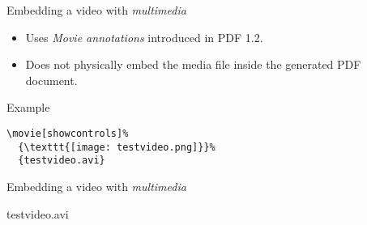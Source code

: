 \documentclass{beamer}
\begin{document}
\begin{frame}[fragile]{Embedding a video with \emph{multimedia}}
  \begin{block}{} 
    \begin{itemize}
      \item Uses \emph{Movie annotations} introduced in PDF 1.2.
      \item Does not physically embed the media file inside the
            generated PDF document.
    \end{itemize}
  \end{block}

  \begin{block}{Example}
    \begin{verbatim}
\movie[showcontrols]%
  {\texttt{[image: testvideo.png]}}%
  {testvideo.avi}
    \end{verbatim}
  \end{block}
\end{frame}


\begin{frame}{Embedding a video with \emph{multimedia}}{}
  \begin{block}{}
    \begin{center}
        {testvideo.avi}
    \end{center}
  \end{block}
\end{frame}
\end{document}
